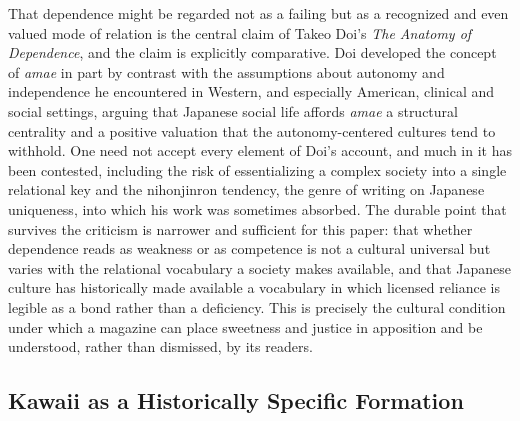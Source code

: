 That dependence might be regarded not as a failing but as a recognized and even valued mode of relation is the central claim of Takeo Doi's \textit{The Anatomy of Dependence}, and the claim is explicitly comparative. Doi developed the concept of \textit{amae} in part by contrast with the assumptions about autonomy and independence he encountered in Western, and especially American, clinical and social settings, arguing that Japanese social life affords \textit{amae} a structural centrality and a positive valuation that the autonomy-centered cultures tend to withhold. One need not accept every element of Doi's account, and much in it has been contested, including the risk of essentializing a complex society into a single relational key and the nihonjinron tendency, the genre of writing on Japanese uniqueness, into which his work was sometimes absorbed. The durable point that survives the criticism is narrower and sufficient for this paper: that whether dependence reads as weakness or as competence is not a cultural universal but varies with the relational vocabulary a society makes available, and that Japanese culture has historically made available a vocabulary in which licensed reliance is legible as a bond rather than a deficiency. This is precisely the cultural condition under which a magazine can place sweetness and justice in apposition and be understood, rather than dismissed, by its readers.

\subsection{Kawaii as a Historically Specific Formation}

